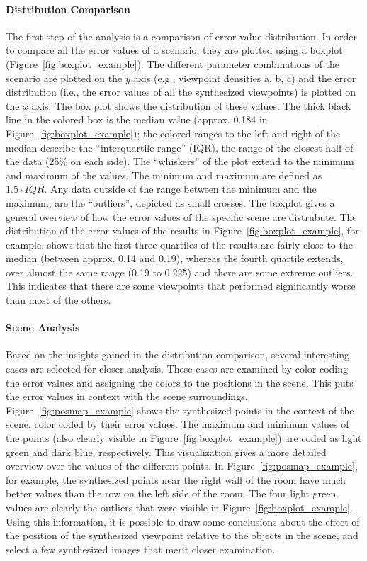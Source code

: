 \paragraph{Distribution Comparison}
The first step of the analysis is a comparison of error value distribution. In order to compare all the error values of a scenario, they are plotted using a boxplot (Figure~\ref{fig:boxplot_example}). The different parameter combinations of the scenario are plotted on the $y$ axis (e.g., viewpoint densities a, b, c) and the error distribution (i.e., the error values of all the synthesized viewpoints) is plotted on the $x$ axis. The box plot shows the distribution of these values: The thick black line in the colored box is the median value (approx. 0.184 in Figure~\ref{fig:boxplot_example}); the colored ranges to the left and right of the median describe the ``interquartile range'' (IQR), the range of the closest half of the data (25\% on each side). The ``whiskers'' of the plot extend to the minimum and maximum of the values. The minimum and maximum are defined as $1.5\cdot IQR$. Any data outside of the range between the minimum and the maximum, are the ``outliers'', depicted as small crosses. The boxplot gives a general overview of how the error values of the specific scene are distrubute. The distribution of the error values of the results in Figure~\ref{fig:boxplot_example}, for example, shows that the first three quartiles of the results are fairly close to the median (between approx. 0.14 and 0.19), whereas the fourth quartile extends, over almost the same range (0.19 to 0.225) and there are some extreme outliers. This indicates that there are some viewpoints that performed significantly worse than most of the others.

\paragraph{Scene Analysis}
Based on the insights gained in the distribution comparison, several interesting cases are selected for closer analysis. These cases are examined by color coding the error values and assigning the colors to the positions in the scene. This puts the error values in context with the scene surroundings. Figure~\ref{fig:posmap_example} shows the synthesized points in the context of the scene, color coded by their error values. The maximum and minimum values of the points (also clearly visible in Figure~\ref{fig:boxplot_example}) are coded as light green and dark blue, respectively. This visualization gives a more detailed overview over the values of the different points. In Figure~\ref{fig:posmap_example}, for example, the synthesized points near the right wall of the room have much better values than the row on the left side of the room. The four light green values are clearly the outliers that were visible in Figure~\ref{fig:boxplot_example}. Using this information, it is possible to draw some conclusions about the effect of the position of the synthesized viewpoint relative to the objects in the scene, and select a few synthesized images that merit closer examination.

